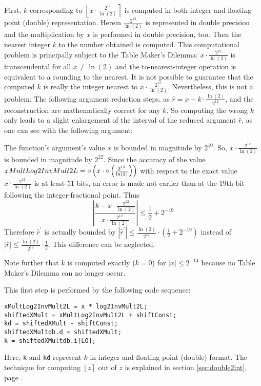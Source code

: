 First, $k$ corresponding to $\left \lfloor x \cdot
\frac{2^{12}}{\ln\left(2 \right)} \right \rceil$ is computed in both
integer and floating point (double) representation. Herein
$\frac{2^{12}}{\ln\left(2 \right)}$ is represented in double precision
and the multiplication by $x$ is performed in double precision,
too. Then the nearest integer $k$ to the number obtained is
computed. This computational problem is principally subject to the
Table Maker's Dilemma: $x \cdot \frac{2^{12}}{\ln\left(2 \right)}$ is
transcendental for all $x \not = \ln\left(2 \right)$ and the
to-nearest-integer operation is equivalent to a rounding to the
nearest. It is not possible to guarantee that the computed $k$ is
really the integer nearest to $x \cdot \frac{2^{12}}{\ln\left(2
\right)}$. Nevertheless, this is not a problem. The following argument
reduction steps, as $\hat{r} = x - k \cdot
\frac{\ln\left(2\right)}{2^{12}}$, and the reconstruction are
mathematically correct for any $k$. So computing the wrong $k$ only
leads to a slight enlargement of the interval of the reduced argument
$\hat{r}$, as one can see with the following argument:

The function's argument's value $x$ is bounded in magnitude by
$2^{10}$. So, $x \cdot \frac{2^{12}}{\ln\left(2 \right)}$ is bounded
in magnitude by $2^{22}$. Since the accuracy of the value
$xMultLog2InvMult2L = \circ \left( x \cdot \circ \left(
\frac{2^{12}}{\ln\left(2 \right)} \right) \right)$ with respect to the
exact value $x \cdot \frac{2^{12}}{\ln\left(2 \right)}$ is at least
$51$ bits, an error is made not earlier than at the $19$th bit
following the integer-fractional point. Thus
$$\left \vert \frac{k - x \cdot \frac{2^{12}}{\ln\left(2
\right)}}{x \cdot \frac{2^{12}}{\ln\left(2
\right)}} \right \vert \leq \frac{1}{2} + 2^{-19}$$
Therefore $\hat{r}^\prime$ is actually bounded by $\left \vert \hat{r}^\prime \right \vert \leq
\frac{\ln\left( 2 \right)}{2^{12}} \cdot \left( \frac{1}{2} + 2^{-19}
\right)$ instead of $\left \vert \hat{r} \right \vert \leq \frac{\ln\left( 2
\right)}{2^{12}} \cdot \frac{1}{2}$. This difference can be neglected.

Note further that $k$ is computed exactly ($k = 0$) for $\left \vert x
\right \vert \leq 2^{-14}$ because no Table Maker's Dilemma can no
longer occur.

This first step is performed by the following code sequence:
\begin{lstlisting}[caption={Argument reduction - first step},firstnumber=1]
xMultLog2InvMult2L = x * log2InvMult2L;
shiftedXMult = xMultLog2InvMult2L + shiftConst;
kd = shiftedXMult - shiftConst;
shiftedXMultdb.d = shiftedXMult;
k = shiftedXMultdb.i[LO];
\end{lstlisting}
Here, \texttt{k} and \texttt{kd} represent $k$ in integer and floating
point (double) format. The technique for computing $\left \lfloor z
\right \rceil$ out of $z$ is explained in section
\ref{sec:double2int}, page \pageref{sec:double2int}.

